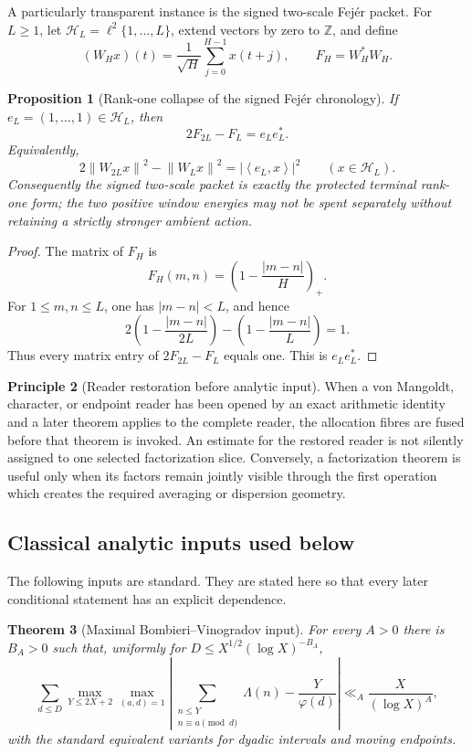 \documentclass[11pt]{article}
\newtheorem{theorem}{Theorem}[section]
\newtheorem{proposition}[theorem]{Proposition}
\theoremstyle{definition}
\newtheorem{principle}[theorem]{Principle}
\theoremstyle{remark}
\newcommand{\Z}{\mathbb Z}
\newcommand{\norm}[1]{\left\lVert#1\right\rVert}
\newcommand{\abs}[1]{\left\lvert#1\right\rvert}
\newcommand{\ip}[2]{\left\langle#1,#2\right\rangle}
\begin{document}
A particularly transparent instance is the signed two-scale Fej\'er packet.
For $L\ge1$, let $\mathcal H_L=\ell^2\{1,\ldots,L\}$, extend vectors by zero
to $\Z$, and define
\[
 (W_Hx)(t)=\frac1{\sqrt H}\sum_{j=0}^{H-1}x(t+j),
 \qquad F_H=W_H^*W_H.
\]

\begin{proposition}[Rank-one collapse of the signed Fej\'er chronology]
\label{prop:arithmetic-Fejer-collapse}
If $e_L=(1,\ldots,1)\in\mathcal H_L$, then
\[
 \boxed{2F_{2L}-F_L=e_Le_L^*.}
 \tag{L.3}
\]
Equivalently,
\[
 2\norm{W_{2L}x}^2-\norm{W_Lx}^2
 =\abs{\ip{e_L}{x}}^2
 \qquad(x\in\mathcal H_L).
\]
Consequently the signed two-scale packet is exactly the protected terminal
rank-one form; the two positive window energies may not be spent separately
without retaining a strictly stronger ambient action.
\end{proposition}

\begin{proof}
The matrix of $F_H$ is
\[
 F_H(m,n)=\left(1-\frac{|m-n|}{H}\right)_+.
\]
For $1\le m,n\le L$, one has $|m-n|<L$, and hence
\[
 2\left(1-\frac{|m-n|}{2L}\right)
 -\left(1-\frac{|m-n|}{L}\right)=1.
\]
Thus every matrix entry of $2F_{2L}-F_L$ equals one.  This is $e_Le_L^*$.
\end{proof}

\begin{principle}[Reader restoration before analytic input]
\label{prin:reader-restoration}
When a von Mangoldt, character, or endpoint reader has been opened by an exact
arithmetic identity and a later theorem applies to the complete reader, the
allocation fibres are fused before that theorem is invoked.  An estimate for
the restored reader is not silently assigned to one selected factorization
slice.  Conversely, a factorization theorem is useful only when its factors
remain jointly visible through the first operation which creates the required
averaging or dispersion geometry.
\end{principle}

\subsection{Classical analytic inputs used below}

The following inputs are standard.  They are stated here so that every later
conditional statement has an explicit dependence.

\begin{theorem}[Maximal Bombieri--Vinogradov input]
\label{thm:weighted-BV-input}
For every $A>0$ there is $B_A>0$ such that, uniformly for
$D\le X^{1/2}(\log X)^{-B_A}$,
\[
 \sum_{d\le D}
 \max_{Y\le2X+2}
 \max_{(a,d)=1}
 \left|
 \sum_{\substack{n\le Y\\ n\equiv a\pmod d}}\Lambda(n)
 -\frac{Y}{\varphi(d)}
 \right|
 \ll_A\frac{X}{(\log X)^A},
\]
with the standard equivalent variants for dyadic intervals and moving
endpoints.
\end{theorem}
\end{document}
